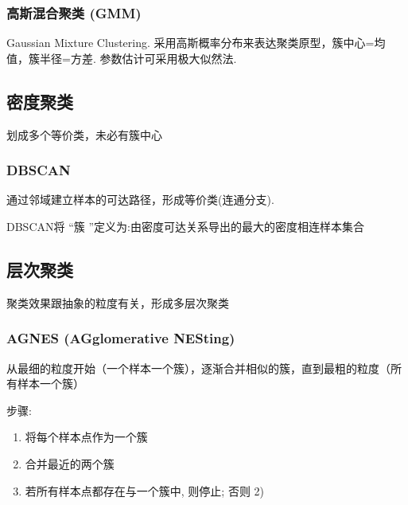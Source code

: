 \subsubsection{高斯混合聚类 (GMM)}
Gaussian Mixture Clustering. 采用高斯概率分布来表达聚类原型，簇中心=均值，簇半径=方差. 参数估计可采用极大似然法. 

\subsection{密度聚类}
划成多个等价类，未必有簇中心

\subsubsection{DBSCAN}
通过邻域建立样本的可达路径，形成等价类(连通分支). 

DBSCAN将 “簇 ”定义为:由密度可达关系导出的最大的密度相连样本集合

\subsection{层次聚类}
聚类效果跟抽象的粒度有关，形成多层次聚类

\subsubsection{AGNES (AGglomerative NESting)}
从最细的粒度开始（一个样本一个簇），逐渐合并相似的簇，直到最粗的粒度（所有样本一个簇）

步骤:
\begin{enumerate}
    \item 将每个样本点作为一个簇
    \item 合并最近的两个簇
    \item 若所有样本点都存在与一个簇中, 则停止; 否则 2)
\end{enumerate}